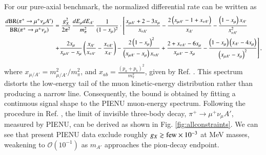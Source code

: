 \documentclass[onecolumn, aps, nofootinbib, prd, preprint, floats, floatfix, amsmath, amssymb, superscriptaddress, preprintnumbers]{revtex4-1}
\begin{document}
For our pure-axial benchmark, the normalized differential rate can be written as \cite{Altmannshofer:2026opc}
\begin{equation}\label{eq:pion-axial-spectrum}
\begin{aligned}
\frac{d{\rm BR}(\pi^+\to\mu^+\nu_\mu A')}
{{\rm BR}(\pi^+\to\mu^+\nu_\mu)}
&=\frac{g_X^2}{2\pi^2}\,
\frac{dE_\mu dE_{A'}}{m_\pi^2}\,
\frac{1}{(1-x_\mu)^2}\cdot \left[\frac{x_{\mu A'}+2-3 x_{\mu}}{x_{\nu A'}}-\frac{2\left(x_{\mu A'}-1+x_{\nu A'}\right)}{x_{A'}}-\frac{\left(1-x_{\mu}\right) x_{A'}}{x_{\nu A'}^2}\right.\\
& \left. +\frac{2 x_{\mu}}{x_{\mu A'}-x_{\mu}}\left(\frac{x_{A'}}{x_{\nu A'}}-\frac{x_{\nu A'}}{x_{A'}}\right) -\frac{2\left(1-x_{\mu}\right)^2}{\left(x_{\mu A'}-x_{\mu}\right) x_{\nu A'}}+\frac{2+x_{\nu A'}-6 x_{\mu}}{x_{\mu A'}-x_{\mu}}-\frac{\left(1-x_{\mu}\right)\left(x_{A'}-4 x_{\mu}\right)}{\left(x_{\mu A'}-x_{\mu}\right)^2}\right],
\end{aligned}
\end{equation}
where $x_{\mu/A'}=m_{\mu/A'}^2/m_\pi^2$, and $x_{a b}=\frac{(p_a+p_b)^2}{m_\pi^2}$, given by Ref. \cite{Altmannshofer:2026opc}. This spectrum distorts the low-energy tail of the muon kinetic-energy distribution rather than producing a narrow line. Consequently, the bound is obtained by fitting a continuous signal shape to the PIENU muon-energy spectrum. Following the procedure in Ref. \cite{Altmannshofer:2026opc}, the limit of invisible three-body decay, $\pi^+\to\mu^+\nu_\mu A'$, measured by PIENU, can be derived as shown in Fig. \ref{fig:allconstraints}.
We can see that present PIENU data exclude roughly $g_X\gtrsim{\rm few}\times10^{-3}$ at MeV masses, weakening to $\mathcal O(10^{-1})$ as $m_{A'}$ approaches the pion-decay endpoint.
\end{document}
